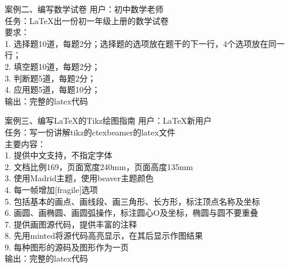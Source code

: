 \documentclass{ctexbeamer}
\begin{document}
\begin{frame}[t]{案例二、编写数学试卷}
\fontsize{10pt}{14pt}\selectfont
\alert{用户：初中数学老师}\\
\alert{任务：LaTeX出一份初一年级上册的数学试卷}\\
要求：\\
1. 选择题10道，每题2分；选择题的选项放在题干的下一行，4个选项放在同一行；\\
2. 填空题10道，每题2分；\\
3. 判断题5道，每题2分；\\
4. 应用题5道，每题10分；\\
\alert{输出：完整的latex代码}
\end{frame}

\begin{frame}[t]{案例三、编写LaTeX的Tikz绘图指南}
\fontsize{12pt}{14pt}\selectfont
\alert{用户：LaTeX新用户}\\
\alert{任务：写一份讲解tikz的ctexbeamer的latex文件}\\
主要内容：\\
1. 提供中文支持，不指定字体\\
2. 文档比例169，页面宽度240mm，页面高度135mm\\
3. 使用Madrid主题，使用beaver主题颜色\\
4. 每一帧增加[fragile]选项\\
5. 包括基本的画点、画线段、画三角形、长方形，标注顶点名称及坐标\\
6. 画圆、画椭圆、画圆弧操作，标注圆心O及坐标，椭圆与圆不要重叠\\
7. 提供画图源代码，提供丰富的注释\\
8. 先用minted将源代码高亮显示，在其后显示作图结果\\
9. 每种图形的源码及图形作为一页\\
\alert{输出：完整的latex代码}
\end{frame}
\end{document}
